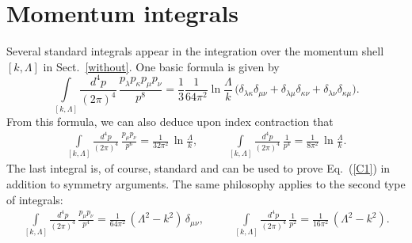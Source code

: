 \documentclass[a4paper,12pt]{article}
\newcommand{\re}[1]{~(\ref{#1})}
\begin{document}
\section{Momentum integrals}
Several standard integrals appear in the integration over the momentum
shell $[k,\Lambda]$ in Sect.~\ref{without}. One basic formula is given
by
\begin{equation}
\int\limits_{[k,\Lambda]} 
\frac{d^4p}{(2\pi)^4} \, \frac{p_\lambda p_\kappa p_\mu
  p_\nu}{p^8} =\frac{1}{3} \frac{1}{64\pi^2} \ln \frac{\Lambda}{k}\,
\bigl( \delta_{\lambda\kappa}\delta_{\mu\nu} +\delta_{\lambda\mu}
\delta_{\kappa\nu} +\delta_{\lambda\nu}
\delta_{\kappa\mu}\bigr). \label{C1}
\end{equation}
From this formula, we can also deduce upon index contraction that
\begin{eqnarray}
\int\limits_{[k,\Lambda]} 
\frac{d^4p}{(2\pi)^4} \,\frac{p_\mu p_\nu}{p^6} = \frac{1}{32\pi^2}
\, \ln \frac{\Lambda}{k},\quad&&
\int\limits_{[k,\Lambda]} 
\frac{d^4p}{(2\pi)^4} \,\frac{1}{p^4} = \frac{1}{8\pi^2}
\, \ln \frac{\Lambda}{k}. \label{C3}
\end{eqnarray}
The last integral is, of course, standard and can be used to prove
Eq.\re{C1} in addition to symmetry arguments. The same philosophy
applies to the second type of integrals:
\begin{eqnarray}
\int\limits_{[k,\Lambda]} 
\frac{d^4p}{(2\pi)^4} \,\frac{p_\mu p_\nu}{p^4} = \frac{1}{64\pi^2}
\, (\Lambda^2-k^2)\, \delta_{\mu\nu}, \quad&&
\int\limits_{[k,\Lambda]} 
\frac{d^4p}{(2\pi)^4} \,\frac{1}{p^2} = \frac{1}{16\pi^2}
\, (\Lambda^2-k^2). \label{C5}
\end{eqnarray}
\end{document}
